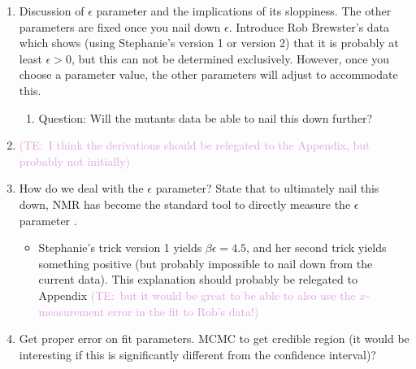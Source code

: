 \documentclass[10pt,letterpaper]{article}
\newcommand{\talComment}[1]{\textcolor{Plum}{(TE:~#1)}}
\begin{document}
\begin{enumerate}
	\item Discussion of $\epsilon$ parameter and the implications of its sloppiness. The other parameters are fixed once you nail down $\epsilon$. Introduce Rob Brewster's data  which shows (using Stephanie's version 1 or version 2) that it is probably at least $\epsilon > 0$, but this can not be determined exclusively. However, once you choose a parameter value, the other parameters will adjust to accommodate this.
	\begin{enumerate}
		\item Question: Will the mutants data be able to nail this down further?
	\end{enumerate}
	
	\item \talComment{I think the derivations should be relegated to the Appendix, but probably not initially}
	
	\item How do we deal with the $\epsilon$ parameter? State that to ultimately nail this down, NMR has become the standard tool to directly measure the $\epsilon$ parameter \cite{Gardino2003, Boulton2016}.
	\begin{itemize}
		\item Stephanie's trick version 1 yields $\beta \epsilon = 4.5$, and her second trick yields something positive (but probably impossible to nail down from the current data). This explanation should probably be relegated to Appendix \talComment{but it would be great to be able to also use the $x$-measurement error in the fit to Rob's data!}
	\end{itemize}
	
	\item Get proper error on fit parameters. MCMC to get credible region (it would be interesting if this is significantly different from the confidence interval)?
\end{enumerate}

\nolinenumbers



\end{document}
